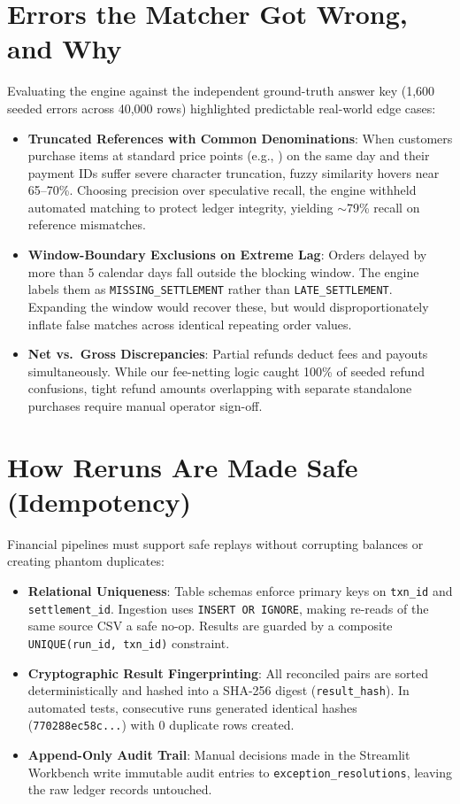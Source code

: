 \documentclass[10pt,a4paper]{article}
\begin{document}
\section{Errors the Matcher Got Wrong, and Why}
Evaluating the engine against the independent ground-truth answer key (1,600 seeded errors across 40,000 rows) highlighted predictable real-world edge cases:

\begin{itemize}
    \item \textbf{Truncated References with Common Denominations}: When customers purchase items at standard price points (e.g., ) on the same day and their payment IDs suffer severe character truncation, fuzzy similarity hovers near 65--70\%. Choosing precision over speculative recall, the engine withheld automated matching to protect ledger integrity, yielding $\sim$79\% recall on reference mismatches.
    \item \textbf{Window-Boundary Exclusions on Extreme Lag}: Orders delayed by more than 5 calendar days fall outside the blocking window. The engine labels them as \texttt{MISSING\_SETTLEMENT} rather than \texttt{LATE\_SETTLEMENT}. Expanding the window would recover these, but would disproportionately inflate false matches across identical repeating order values.
    \item \textbf{Net vs.\ Gross Discrepancies}: Partial refunds deduct fees and payouts simultaneously. While our fee-netting logic caught 100\% of seeded refund confusions, tight refund amounts overlapping with separate standalone purchases require manual operator sign-off.
\end{itemize}

\section{How Reruns Are Made Safe (Idempotency)}
Financial pipelines must support safe replays without corrupting balances or creating phantom duplicates:

\begin{itemize}
    \item \textbf{Relational Uniqueness}: Table schemas enforce primary keys on \texttt{txn\_id} and \texttt{settlement_id}. Ingestion uses \texttt{INSERT OR IGNORE}, making re-reads of the same source CSV a safe no-op. Results are guarded by a composite \texttt{UNIQUE(run\_id, txn\_id)} constraint.
    \item \textbf{Cryptographic Result Fingerprinting}: All reconciled pairs are sorted deterministically and hashed into a SHA-256 digest (\texttt{result\_hash}). In automated tests, consecutive runs generated identical hashes (\texttt{770288ec58c...}) with 0 duplicate rows created.
    \item \textbf{Append-Only Audit Trail}: Manual decisions made in the Streamlit Workbench write immutable audit entries to \texttt{exception\_resolutions}, leaving the raw ledger records untouched.
\end{itemize}
\end{document}
